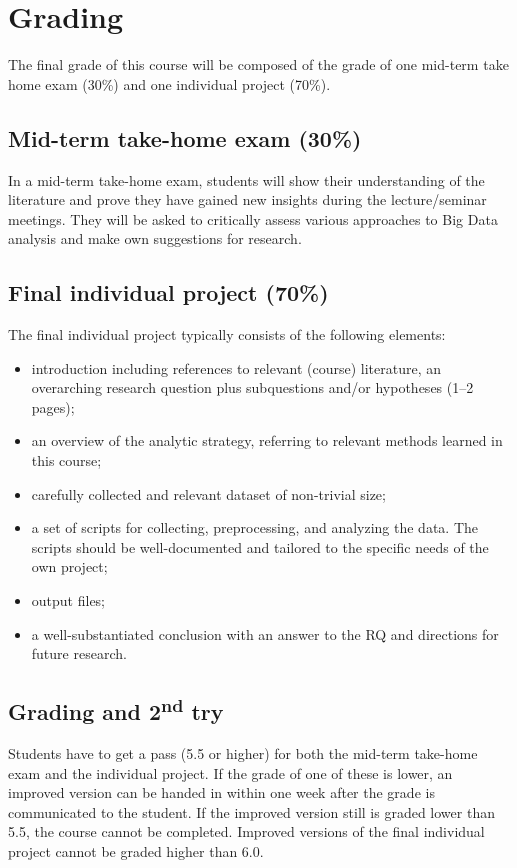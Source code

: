 \documentclass[a4paper,12pt]{report}
\begin{document}
\section*{Grading}

The final grade of this course will be composed of the grade of one mid-term take home exam (30\%) and one individual project (70\%).

\subsection*{Mid-term take-home exam (30\%)}
In a mid-term take-home exam, students will show their understanding of the literature and prove they have gained new insights during the lecture/seminar meetings. They will be asked to critically assess various approaches to Big Data analysis and make own suggestions for research.

\subsection*{Final individual project (70\%)}
The final individual project typically consists of the following elements:
\begin{itemize}
\item introduction including references to relevant (course) literature, an overarching research question plus subquestions and/or hypotheses (1–2 pages);
\item an overview of the analytic strategy, referring to relevant methods learned in this course;
\item carefully collected and relevant dataset of non-trivial size;
\item a set of scripts for collecting, preprocessing, and analyzing the data. The scripts should be well-documented and tailored to the specific needs of the own project;
\item output files;
\item a well-substantiated conclusion with an answer to the RQ and directions for future research.
\end{itemize}

\subsection*{Grading and 2\textsuperscript{nd} try}
Students have to get a pass (5.5 or higher) for both the mid-term take-home exam and the individual project. If the grade of one of these is lower, an improved version can be handed in within one week after the grade is communicated to the student. If the improved version still is graded lower than 5.5, the course cannot be completed. Improved versions of the final individual project cannot be graded higher than 6.0. 
\end{document}
